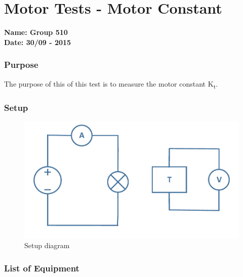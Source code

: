 \pagebreak
\section{Motor Tests - Motor Constant} \label{app:motorTestMotorConstant}
\textbf{Name: Group 510}\\
\textbf{Date: 30/09 - 2015}

\subsubsection{Purpose}
The purpose of this of this test is to measure the motor constant \si{K_t}.

\subsubsection{Setup}
\begin{figure}[H]
  \centering
	\includegraphics[scale=0.5]{figures/MotorTest5.pdf}
	\caption{Setup diagram}
\end{figure}

\subsubsection{List of Equipment}

